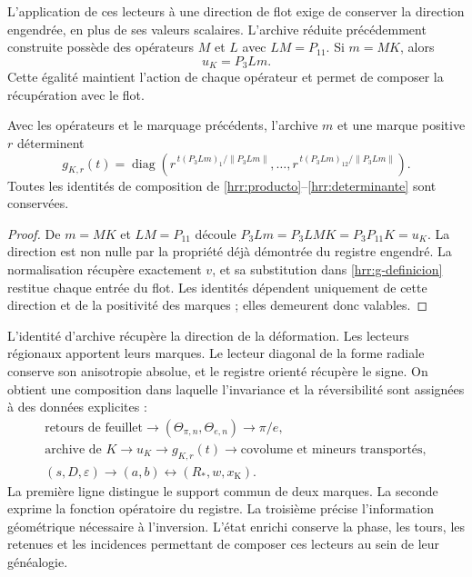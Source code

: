 L’application de ces lecteurs à une direction de flot exige de conserver la direction engendrée, en plus de ses valeurs scalaires. L’archive réduite précédemment construite possède des opérateurs \(M\) et \(L\) avec \(LM=P_{11}\). Si \(m=MK\), alors
\begin{equation}
 u_K=P_3Lm.
 \label{hrr:archivo-direccion}
\end{equation}
Cette égalité maintient l’action de chaque opérateur et permet de composer la récupération avec le flot.

\begin{proposition}
\label{hrr:archivo-flujo} Avec les opérateurs et le marquage précédents, l’archive \(m\) et une marque positive \(r\) déterminent
\[
 g_{K,r}(t)=
 \operatorname{diag}\left(
 r^{\,t(P_3Lm)_1/\|P_3Lm\|},\ldots,
 r^{\,t(P_3Lm)_{12}/\|P_3Lm\|}\right).
\]
Toutes les identités de composition de \eqref{hrr:producto}--\eqref{hrr:determinante} sont conservées.
\end{proposition}
\begin{proof}
De \(m=MK\) et \(LM=P_{11}\) découle \(P_3Lm=P_3LMK=P_3P_{11}K=u_K\). La direction est non nulle par la propriété déjà démontrée du registre engendré. La normalisation récupère exactement \(v\), et sa substitution dans \eqref{hrr:g-definicion} restitue chaque entrée du flot. Les identités dépendent uniquement de cette direction et de la positivité des marques ; elles demeurent donc valables.
\end{proof}

L’identité d’archive récupère la direction de la déformation. Les lecteurs régionaux apportent leurs marques. Le lecteur diagonal de la forme radiale conserve son anisotropie absolue, et le registre orienté récupère le signe. On obtient une composition dans laquelle l’invariance et la réversibilité sont assignées à des données explicites :
\[
 \begin{gathered}
 \text{retours de feuillet}
 \longrightarrow(\Theta_{\pi,n},\Theta_{e,n})
 \longrightarrow\pi/e,\\
 \text{archive de }K\longrightarrow u_K
 \longrightarrow g_{K,r}(t)
 \longrightarrow\text{covolume et mineurs transportés},\\
 (s,D,\varepsilon)\longrightarrow(a,b)
 \longleftrightarrow(R_*,w,x_{\mathrm K}).
 \end{gathered}
\]
La première ligne distingue le support commun de deux marques. La seconde exprime la fonction opératoire du registre. La troisième précise l’information géométrique nécessaire à l’inversion. L’état enrichi conserve la phase, les tours, les retenues et les incidences permettant de composer ces lecteurs au sein de leur généalogie.

